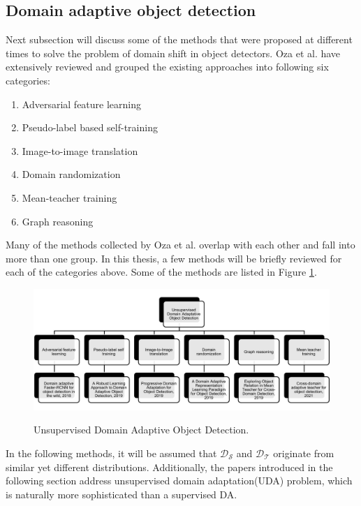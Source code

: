 \subsection{Domain adaptive object detection}
\label{DAobj} 
Next subsection will discuss some of the methods that were proposed at different times to solve the problem of domain shift in object detectors. Oza et al.  \cite{Oza2021} have extensively reviewed and grouped the existing approaches into following six categories:
\begin{enumerate}
	\item Adversarial feature learning
	\item Pseudo-label based self-training
	\item Image-to-image translation
	\item Domain randomization 
	\item Mean-teacher training
	\item Graph reasoning
\end{enumerate} 

Many of the methods collected by Oza et al. overlap with each other and fall into more than one group. In this thesis, a few methods will be briefly reviewed for each of the categories above. Some of the methods are listed in Figure \ref{UDA_OD}.

\begin{figure}[htb]
	\begin{center}
		\includegraphics[width=16cm]{./UDA_OD.png}
	\end{center}
	\caption{Unsupervised Domain Adaptive Object Detection.}
	\begin{center}
		\label{UDA_OD}
	\end{center}
\end{figure}
\FloatBarrier

In the following methods, it will be assumed that $\mathcal{D_S}$ and $\mathcal{D_T}$ originate from similar yet different distributions. Additionally, the papers introduced in the following section address unsupervised domain adaptation(UDA) problem, which is naturally more sophisticated than a supervised DA.

